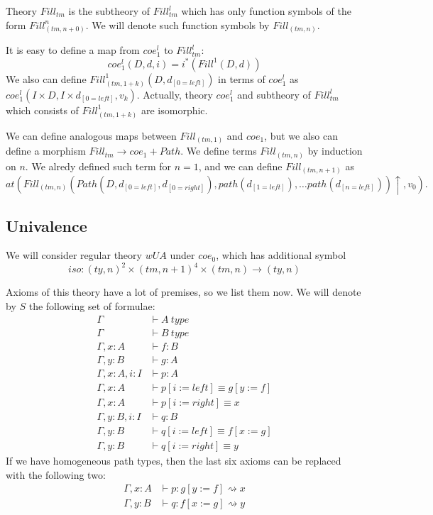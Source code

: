 \documentclass[reqno]{amsart}
\theoremstyle{definition}
\theoremstyle{remark}
\newcommand{\deq}{\equiv}
\newcommand{\repl}{:=}
\newcommand{\idtype}{\rightsquigarrow}
\numberwithin{figure}{section}
\begin{document}
Theory $Fill_{tm}$ is the subtheory of $Fill^l_{tm}$ which has only function symbols of the form $Fill^n_{(tm,n+0)}$.
We will denote such function symbols by $Fill_{(tm,n)}$.

It is easy to define a map from $coe^l_1$ to $Fill^l_{tm}$:
\[ coe^l_1(D, d, i) = i^*(Fill^1(D, d)) \]
We also can define $Fill^1_{(tm,1+k)}(D, d_{[0 = left]})$ in terms of $coe^l_1$ as $coe^l_1(I \times D, I \times d_{[0 = left]}, v_k)$.
Actually, theory $coe^l_1$ and subtheory of $Fill^l_{tm}$ which consists of $Fill^1_{(tm,1+k)}$ are isomorphic.

We can define analogous maps between $Fill_{(tm,1)}$ and $coe_1$, but we also can define a morphism $Fill_{tm} \to coe_1 + Path$.
We define terms $Fill_{(tm,n)}$ by induction on $n$.
We alredy defined such term for $n = 1$, and we can define $Fill_{(tm,n+1)}$ as
\[ at(Fill_{(tm,n)}(Path(D, d_{[0 = left]}, d_{[0 = right]}), path(d_{[1 = left]}), \ldots path(d_{[n = left]}))\!\uparrow, v_0). \]

\subsection{Univalence}
\label{sec:univalence}

We will consider regular theory $wUA$ under $coe_0$, which has additional symbol
\[ iso : (ty,n)^2 \times (tm,n+1)^4 \times (tm,n) \to (ty,n) \]

Axioms of this theory have a lot of premises, so we list them now.
We will denote by $S$ the following set of formulae:
\begin{align*}
\Gamma & \vdash A\ type \\
\Gamma & \vdash B\ type \\
\Gamma, x : A & \vdash f : B \\
\Gamma, y : B & \vdash g : A \\
\Gamma, x : A, i : I & \vdash p : A \\
\Gamma, x : A & \vdash p[i \repl left] \deq g[y \repl f] \\
\Gamma, x : A & \vdash p[i \repl right] \deq x \\
\Gamma, y : B, i : I & \vdash q : B \\
\Gamma, y : B & \vdash q[i \repl left] \deq f[x \repl g] \\
\Gamma, y : B & \vdash q[i \repl right] \deq y
\end{align*}
If we have homogeneous path types, then the last six axioms can be replaced with the following two:
\begin{align*}
\Gamma, x : A & \vdash p : g[y \repl f] \idtype x \\
\Gamma, y : B & \vdash q : f[x \repl g] \idtype y
\end{align*}
\end{document}
